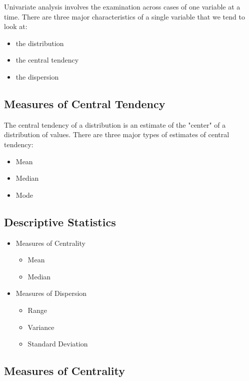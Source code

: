 \documentclass[]{report}
\begin{document}
Univariate analysis involves the examination across cases of one variable at a time. There are three major characteristics of a single variable that we tend to look at:

\begin{itemize}
\item the distribution
\item the central tendency
\item the dispersion
\end{itemize}



\subsection{Measures of Central Tendency}
The central tendency of a distribution is an estimate of the "center" of a distribution of values. There are three major types of estimates of central tendency:

\begin{itemize}
\item Mean
\item Median
\item Mode
\end{itemize}

\subsection{Descriptive Statistics}



\begin{itemize}
\item Measures of Centrality
\begin{itemize}
\item Mean
\item Median
\end{itemize}
\item Measures of Dispersion
\begin{itemize}
\item Range
\item Variance
\item Standard Deviation
\end{itemize}
\end{itemize}


\subsection{Measures of Centrality}
\end{document}
